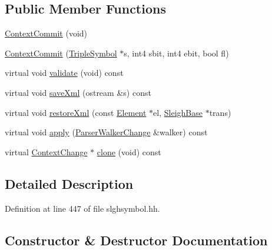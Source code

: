 \subsection*{Public Member Functions}
\begin{DoxyCompactItemize}
\item 
\mbox{\hyperlink{class_context_commit_a7eaef6830515b4c92f44bff42004ff16}{Context\+Commit}} (void)
\item 
\mbox{\hyperlink{class_context_commit_a751263f546f0f883d2c31fb6bc4cfac0}{Context\+Commit}} (\mbox{\hyperlink{class_triple_symbol}{Triple\+Symbol}} $\ast$s, int4 sbit, int4 ebit, bool fl)
\item 
virtual void \mbox{\hyperlink{class_context_commit_a11c0204a16fbbb69fedf147aebde173c}{validate}} (void) const
\item 
virtual void \mbox{\hyperlink{class_context_commit_a38e0c54f39dba0542a8433401980d78e}{save\+Xml}} (ostream \&s) const
\item 
virtual void \mbox{\hyperlink{class_context_commit_ae695eedc084ebe7a75bd7f4d205518d0}{restore\+Xml}} (const \mbox{\hyperlink{class_element}{Element}} $\ast$el, \mbox{\hyperlink{class_sleigh_base}{Sleigh\+Base}} $\ast$trans)
\item 
virtual void \mbox{\hyperlink{class_context_commit_a9f474b1411ad14072fbae6397298a449}{apply}} (\mbox{\hyperlink{class_parser_walker_change}{Parser\+Walker\+Change}} \&walker) const
\item 
virtual \mbox{\hyperlink{class_context_change}{Context\+Change}} $\ast$ \mbox{\hyperlink{class_context_commit_aa3eed58d105a955678d30a2371fd7050}{clone}} (void) const
\end{DoxyCompactItemize}


\subsection{Detailed Description}


Definition at line 447 of file slghsymbol.\+hh.



\subsection{Constructor \& Destructor Documentation}
\mbox{\label{class_context_commit_a7eaef6830515b4c92f44bff42004ff16}} 
